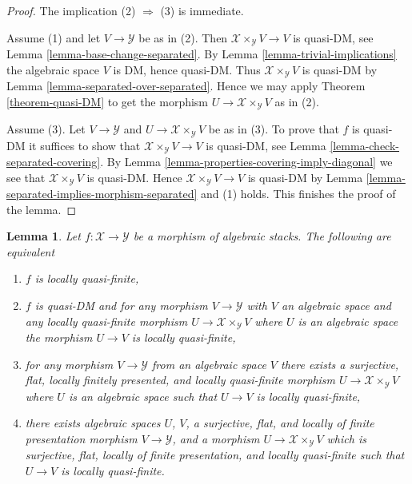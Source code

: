 \documentclass{stacks-project}
\theoremstyle{plain}
\newtheorem{lemma}[subsection]{Lemma}
\theoremstyle{definition}
\theoremstyle{remark}
\numberwithin{equation}{subsection}
\begin{document}
\begin{proof}
The implication (2) $\Rightarrow$ (3) is immediate.

\medskip\noindent
Assume (1) and let $V \to \mathcal{Y}$ be as in (2). Then
$\mathcal{X} \times_\mathcal{Y} V \to V$ is quasi-DM, see
Lemma \ref{lemma-base-change-separated}.
By
Lemma \ref{lemma-trivial-implications}
the algebraic space $V$ is DM, hence quasi-DM. Thus
$\mathcal{X} \times_\mathcal{Y} V$ is quasi-DM by
Lemma \ref{lemma-separated-over-separated}.
Hence we may apply
Theorem \ref{theorem-quasi-DM}
to get the morphism $U \to \mathcal{X} \times_\mathcal{Y} V$
as in (2).

\medskip\noindent
Assume (3). Let $V \to \mathcal{Y}$ and
$U \to \mathcal{X} \times_\mathcal{Y} V$ be as in (3).
To prove that $f$ is quasi-DM it suffices to show that
$\mathcal{X} \times_\mathcal{Y} V \to V$ is quasi-DM, see
Lemma \ref{lemma-check-separated-covering}.
By
Lemma \ref{lemma-properties-covering-imply-diagonal}
we see that $\mathcal{X} \times_\mathcal{Y} V$ is quasi-DM.
Hence $\mathcal{X} \times_\mathcal{Y} V \to V$ is quasi-DM by
Lemma \ref{lemma-separated-implies-morphism-separated}
and (1) holds. This finishes the proof of the lemma.
\end{proof}

\begin{lemma}
\label{lemma-characterize-locally-quasi-finite}
Let $f : \mathcal{X} \to \mathcal{Y}$ be a morphism of algebraic stacks.
The following are equivalent
\begin{enumerate}
\item $f$ is locally quasi-finite,
\item $f$ is quasi-DM and for any morphism $V \to \mathcal{Y}$ with $V$
an algebraic space and any locally quasi-finite morphism
$U \to \mathcal{X} \times_\mathcal{Y} V$ where $U$ is an algebraic space
the morphism $U \to V$ is locally quasi-finite,
\item for any morphism $V \to \mathcal{Y}$ from an algebraic space $V$
there exists a surjective, flat, locally finitely presented, and locally
quasi-finite morphism $U \to \mathcal{X} \times_\mathcal{Y} V$ where
$U$ is an algebraic space such that $U \to V$ is locally quasi-finite,
\item there exists algebraic spaces $U$, $V$, a surjective, flat,
and locally of finite presentation morphism $V \to \mathcal{Y}$,
and a morphism $U \to \mathcal{X} \times_\mathcal{Y} V$ which
is surjective, flat, locally of finite presentation, and
locally quasi-finite such that $U \to V$ is locally quasi-finite.
\end{enumerate}
\end{lemma}
\end{document}
